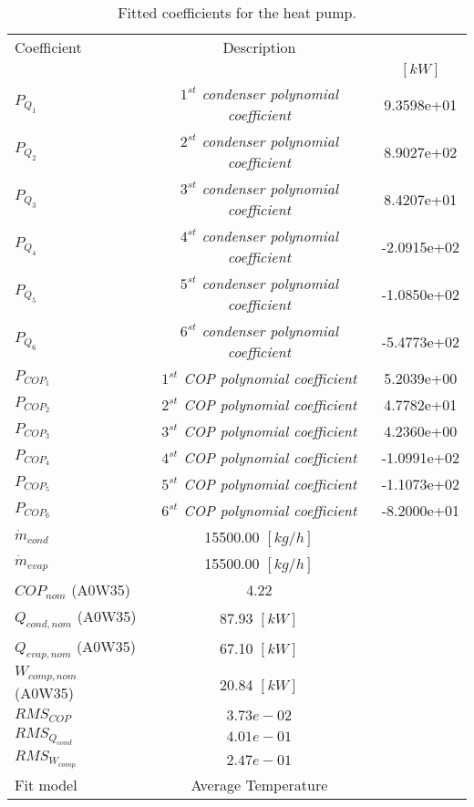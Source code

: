 \documentclass[english]{SPFShortReport}
\author{Dani Carbonell}
\begin{document}
\begin{table}[!ht]
\begin{small}
\caption{Fitted coefficients for the heat pump.}
\begin{center}
\resizebox{12cm}{!} 
{
\begin{tabular}{l | c c } 
\hline
\hline
Coefficient &Description & \\ 
 & &$[kW]$\\ 
\hline
$P_{Q_{1}}$ & \emph{$1^{st}$ condenser polynomial coefficient}  & 9.3598e+01    \\ 
$P_{Q_{2}}$ & \emph{$2^{st}$ condenser polynomial coefficient}  & 8.9027e+02    \\ 
$P_{Q_{3}}$ & \emph{$3^{st}$ condenser polynomial coefficient}  & 8.4207e+01    \\ 
$P_{Q_{4}}$ & \emph{$4^{st}$ condenser polynomial coefficient}  & -2.0915e+02    \\ 
$P_{Q_{5}}$ & \emph{$5^{st}$ condenser polynomial coefficient}  & -1.0850e+02    \\ 
$P_{Q_{6}}$ & \emph{$6^{st}$ condenser polynomial coefficient}  & -5.4773e+02    \\ 
\hline
$P_{COP_{1}}$ & \emph{$1^{st}$ COP polynomial coefficient}  & 5.2039e+00    \\ 
$P_{COP_{2}}$ & \emph{$2^{st}$ COP polynomial coefficient}  & 4.7782e+01    \\ 
$P_{COP_{3}}$ & \emph{$3^{st}$ COP polynomial coefficient}  & 4.2360e+00    \\ 
$P_{COP_{4}}$ & \emph{$4^{st}$ COP polynomial coefficient}  & -1.0991e+02    \\ 
$P_{COP_{5}}$ & \emph{$5^{st}$ COP polynomial coefficient}  & -1.1073e+02    \\ 
$P_{COP_{6}}$ & \emph{$6^{st}$ COP polynomial coefficient}  & -8.2000e+01    \\ 
\hline
$\dot m_{cond}$ & 15500.00 $[kg/h]$ \\ 
$\dot m_{evap}$ & 15500.00 $[kg/h]$ \\ 
\hline
$COP_{nom}$ (A0W35)& 4.22 \\ 
$Q_{cond,nom}$ (A0W35)& 87.93 $[kW]$\\ 
$Q_{evap,nom}$ (A0W35)& 67.10 $[kW]$\\ 
$W_{comp,nom}$ (A0W35)& 20.84 $[kW]$\\ 
\hline
 $RMS_{COP}$ & $3.73e-02$ \\ 
 $RMS_{Q_{cond}}$ & $4.01e-01$ \\ 
 $RMS_{W_{comp}}$ & $2.47e-01$ \\ 
\hline
Fit model & Average Temperature\\ 
\hline
\hline
\end{tabular}
}
\label{CoefTable}
\end{center}
\end{small}
\end{table}
\end{document}
